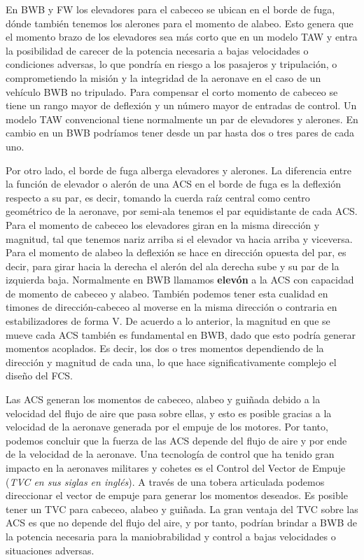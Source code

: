 En BWB y FW los elevadores para el cabeceo se ubican en el borde de fuga, dónde también tenemos los alerones para el momento de alabeo. Esto genera que el momento brazo de los elevadores sea más corto que en un modelo TAW y entra la posibilidad de carecer de la potencia necesaria a bajas velocidades o condiciones adversas, lo que pondría en riesgo a los pasajeros y tripulación, o comprometiendo la misión y la integridad de la aeronave en el caso de un vehículo BWB no tripulado.
Para compensar el corto momento de cabeceo se tiene un rango mayor de deflexión y un número mayor de entradas de control. 
 Un modelo TAW convencional tiene normalmente un par de elevadores y alerones. En cambio en un BWB podríamos tener desde un par hasta dos o tres pares de cada uno.
 
Por otro lado, el borde de fuga alberga elevadores y alerones. 
La diferencia entre la función de elevador o alerón de una ACS en el borde de fuga es la deflexión respecto a su par, es decir, tomando la cuerda raíz central como centro geométrico de la aeronave, por semi-ala tenemos el par equidistante de cada ACS. Para el momento de cabeceo los elevadores giran en la misma dirección y magnitud, tal que tenemos nariz arriba si el elevador va hacia arriba y viceversa. 
%
Para el momento de alabeo la deflexión se hace en dirección opuesta del par, es decir, para girar hacia la derecha el alerón del ala derecha sube y su par de la izquierda baja. Normalmente en BWB llamamos \textbf{elevón}  a la ACS con capacidad de momento de cabeceo y alabeo. También podemos tener esta cualidad en timones de dirección-cabeceo al moverse en la misma dirección o contraria en estabilizadores de forma V. 
%
De acuerdo a lo anterior, la magnitud en que se mueve cada ACS también es fundamental en BWB, dado que esto podría generar momentos acoplados. Es decir, los dos o tres momentos dependiendo de la dirección y magnitud de cada una, lo que hace significativamente complejo el diseño del FCS. 

Las ACS generan los momentos de cabeceo, alabeo y guiñada debido a la velocidad del flujo de aire que pasa sobre ellas, y esto es posible gracias a la velocidad de la aeronave generada por el empuje de los motores. Por tanto, podemos concluir que la fuerza de las ACS depende del flujo de aire y por ende de la velocidad de la aeronave. 
Una tecnología  de control que ha tenido gran impacto en la aeronaves militares y cohetes es el Control del Vector de Empuje (\textit{TVC en sus siglas en inglés}).  A través de una tobera articulada podemos direccionar el vector de empuje para generar los momentos deseados.  Es posible tener un TVC para cabeceo, alabeo y guiñada. La gran ventaja del TVC sobre las ACS es que no depende del flujo del aire, y por tanto, podrían brindar a BWB de la potencia necesaria para la maniobrabilidad y control a bajas velocidades o situaciones adversas. 

